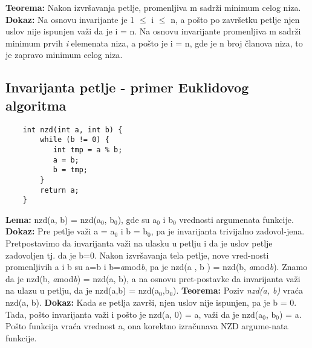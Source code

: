 \documentclass{article}
\begin{document}
\textbf{Teorema:} Nakon izvršavanja petlje, promenljiva m sadrži minimum celog niza.
\newline \hspace*{0.4cm}\textbf{Dokaz:} 
\newline \hspace*{0.8cm}Na osnovu invarijante je 1 $\leq$ i $\leq$ n, a pošto po završetku petlje njen uslov \hspace*{0.8cm}nije ispunjen važi da je 	i = n. Na osnovu invarijante promenljiva m sadrži \hspace*{0.8cm}minimum prvih \textit{i} elemenata niza, a pošto je 	i = n, gde je n broj članova \hspace*{0.8cm}niza, to je zapravo minimum celog niza.

\subsection{Invarijanta petlje - primer Euklidovog algoritma}
\begin{lstlisting}
	int nzd(int a, int b) { 
		while (b != 0) { 
		   int tmp = a % b; 
		   a = b; 
		   b = tmp; 
		} 
		return a; 
	}
\end{lstlisting}

\textbf{Lema:} nzd(a, b) = nzd(a$_{0}$, b$_{0}$), gde su a$_{0}$ i b$_{0}$ vrednosti argumenata funkcije.
\newline \hspace*{0.4cm}\textbf{Dokaz:} 
\newline	\hspace*{0.8cm}Pre petlje važi a = a$_{0}$ i b = b$_{0}$, pa je invarijanta trivijalno zadovol-\hspace*{0.8cm}jena.
	Pretpostavimo da invarijanta važi na ulasku u petlju i da je uslov \hspace*{0.8cm}petlje zadovoljen tj. da je	b=0. Nakon izvršavanja tela petlje, nove vred-\hspace*{0.8cm}nosti promenljivih a i b su a=b i b=\textit{a}mod\textit{b}, pa 	je nzd(a , b ) = nzd(b, \hspace*{0.8cm}\textit{a}mod\textit{b}). Znamo da je nzd(b, \textit{a}mod\textit{b}) = nzd(a, b), a na osnovu 	pret-\hspace*{0.8cm}postavke da invarijanta važi na ulazu u petlju, da je nzd(a,b) = nzd(a$_{0}$,b$_{0}$).
\vspace{0.2cm}	\newline 
\textbf{Teorema:} Poziv \textit{nzd(a, b)} vraća nzd(a, b). 
\newline \hspace*{0.4cm}\textbf{Dokaz:}
\newline \hspace*{0.8cm}Kada se petlja završi, njen uslov nije ispunjen, pa je b = 0. Tada, pošto \hspace*{0.8cm}invarijanta važi i 	pošto je nzd(a, 0) = a, važi da je nzd(a$_{0}$, b$_{0}$) = a. \hspace*{0.8cm}Pošto  funkcija vraća vrednost a, ona korektno 	izračunava NZD argume-\hspace*{0.8cm}nata funkcije.
\end{document}
